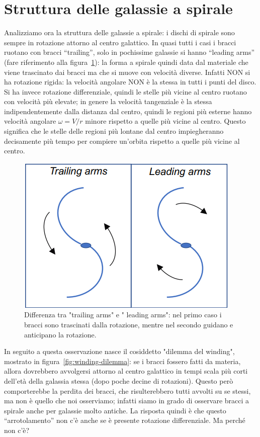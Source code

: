 \section{Struttura delle galassie a spirale}\label{sec:struttura-delle-galassie-a-spirale}
Analizziamo ora la struttura delle galassie a spirale: i dischi di spirale sono sempre in rotazione attorno al centro galattico. In quasi tutti i casi i bracci ruotano con bracci “trailing”, solo in pochissime galassie si hanno “leading arms” (fare riferimento alla figura~\ref{fig:trailing-leading arms}): la forma a spirale quindi data dal materiale che viene trascinato dai bracci ma che si muove con velocità diverse. Infatti NON si ha rotazione rigida: la velocità angolare NON è la stessa in tutti i punti del disco. Si ha invece rotazione differenziale, quindi le stelle più vicine al centro ruotano con velocità più elevate; in genere la velocità tangenziale è la stessa indipendentemente dalla distanza dal centro, quindi le regioni più esterne hanno velocità angolare $\omega = V/r$ minore rispetto a quelle più vicine al centro. Questo significa che le stelle delle regioni più lontane dal centro impiegheranno decisamente più tempo per compiere un'orbita rispetto a quelle più vicine al centro.

\begin{figure}
    \centering
    \includegraphics{immagini/trailing-leading-arms.png}
    \caption[width = 0.5 \textwidth]{Differenza tra "trailing arms" e " leading arms": nel primo caso i bracci sono trascinati dalla rotazione, mentre nel secondo guidano e anticipano la rotazione.}
    \label{fig:trailing-leading arms}
\end{figure}

In seguito a questa osservazione nasce il cosiddetto "dilemma del winding", mostrato in figura~\ref{fig:winding-dilemma}: se i bracci fossero fatti da materia, allora dovrebbero avvolgersi attorno al centro galattico in tempi scala più corti dell’età della galassia stessa (dopo poche decine di rotazioni). Questo però comporterebbe la perdita dei bracci, che risulterebbero tutti avvolti su se stessi, ma non è quello che noi osserviamo; infatti siamo in grado di osservare bracci a spirale anche per galassie molto antiche. La risposta quindi è che questo “arrotolamento” non c’è anche se è presente rotazione differenziale. Ma perché non c'è?

